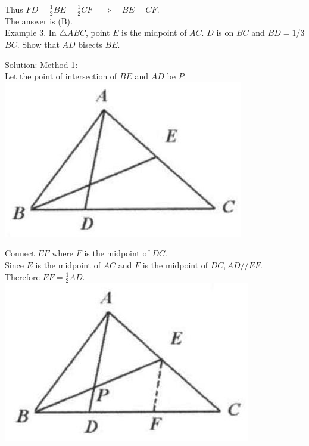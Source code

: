 \documentclass[10pt]{article}
\begin{document}
Thus \(F D=\frac{1}{2} B E=\frac{1}{2} C F \quad \Rightarrow \quad B E=C F\).\\
The answer is (B).\\
Example 3. In \(\triangle A B C\), point \(E\) is the midpoint of \(A C\). \(D\) is on \(B C\) and \(B D=1 / 3\) \(B C\). Show that \(A D\) bisects \(B E\).

Solution:
Method 1:\\
Let the point of intersection of \(B E\) and \(A D\) be \(P\).\\
\includegraphics[max width=\textwidth, center]{2025_04_17_97bc1f7e44d93c271a88g-036(1)}

Connect \(E F\) where \(F\) is the midpoint of \(D C\).\\
Since \(E\) is the midpoint of \(A C\) and \(F\) is the midpoint of \(D C, A D / / E F\).\\
Therefore \(E F=\frac{1}{2} A D\).\\
\includegraphics[max width=\textwidth, center]{2025_04_17_97bc1f7e44d93c271a88g-036}
\end{document}
